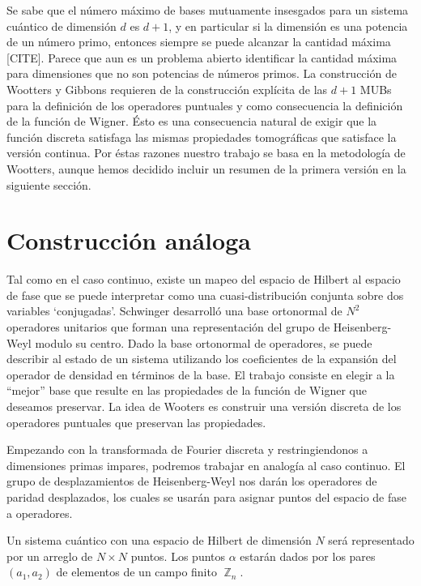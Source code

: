 \documentclass[a4paper]{report}
\DeclareMathOperator{\Z}{\mathbb{Z}}
\begin{document}
  Se sabe que el número máximo de bases mutuamente
  insesgados para un sistema cuántico de dimensión $d$ es
  $d+1$, y en particular si la dimensión es una potencia de
  un número primo, entonces siempre se puede alcanzar la
  cantidad máxima [CITE]. Parece que aun es un problema
  abierto identificar la cantidad máxima para dimensiones
  que no son potencias de números primos. La construcción de
  Wootters y Gibbons requieren de la construcción explícita
  de las $d+1$ MUBs para la definición de los operadores
  puntuales y como consecuencia la definición de la función
  de Wigner. Ésto es una consecuencia natural de
  exigir que la función discreta satisfaga las mismas
  propiedades tomográficas que satisface la versión
  continua. Por éstas razones nuestro trabajo se basa en la
  metodología de Wootters, aunque hemos decidido incluir un
  resumen de la primera versión en la siguiente sección.

  \section{Construcción análoga}

  Tal como en el caso continuo, existe un mapeo del espacio
  de Hilbert al espacio de fase que se puede interpretar
  como una cuasi-distribución conjunta sobre dos variables
  `conjugadas'. Schwinger desarrolló una base ortonormal de
  $N^2$ operadores unitarios que forman una representación
  del grupo de Heisenberg-Weyl modulo su centro. Dado la
  base ortonormal de operadores, se puede describir al
  estado de un sistema utilizando los coeficientes de la
  expansión del operador de densidad en términos de la base.
  El trabajo consiste en elegir a la ``mejor'' base que
  resulte en las propiedades de la función de Wigner que
  deseamos preservar.  La idea de Wooters es construir una
  versión discreta de los operadores puntuales que preservan
  las propiedades. 

  Empezando con la transformada de Fourier discreta y
  restringiendonos a dimensiones primas impares, podremos
  trabajar en analogía al caso continuo. El grupo de
  desplazamientos de Heisenberg-Weyl nos darán los
  operadores de paridad desplazados, los cuales se usarán
  para asignar puntos del espacio de fase a operadores.

  Un sistema cuántico con una espacio de Hilbert de
  dimensión $N$ será representado por un arreglo de $N
  \times N$ puntos. Los puntos $\alpha$ estarán dados por
  los pares $(a_1,a_2)$ de elementos de un campo finito
  $\Z_n$.
\end{document}
